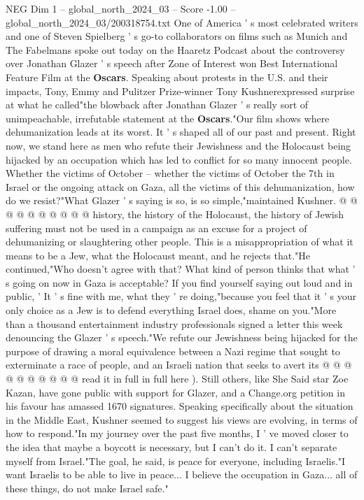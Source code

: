 \begin{textsample}{NEG Dim 1 – global\_north\_2024\_03 – Score -1.00 – global\_north\_2024\_03/200318754.txt}  \label{ex:f1_neg_069}
One of America ' s most celebrated writers and one of Steven Spielberg ' s go-to collaborators on films such as Munich and The Fabelmans spoke out today on the Haaretz Podcast about the controversy over Jonathan Glazer ' s speech after Zone of Interest won Best International Feature Film at the \textbf{Oscars}.
Speaking about protests in the U.S. and their impacts, Tony, Emmy and Pulitzer Prize-winner Tony Kushnerexpressed surprise at what he called"the blowback after Jonathan Glazer ' s really sort of unimpeachable, irrefutable statement at the \textbf{Oscars}."Our film shows where dehumanization leads at its worst.
It ' s shaped all of our past and present.
Right now, we stand here as men who refute their Jewishness and the Holocaust being hijacked by an occupation which has led to conflict for so many innocent people.
Whether the victims of October -- whether the victims of October the 7th in Israel or the ongoing attack on Gaza, all the victims of this dehumanization, how do we resist?"What Glazer ' s saying is so, is so simple,"maintained Kushner. @ @ @ @ @ @ @ @ @ @ history, the history of the Holocaust, the history of Jewish suffering must not be used in a campaign as an excuse for a project of dehumanizing or slaughtering other people.
This is a misappropriation of what it means to be a Jew, what the Holocaust meant, and he rejects that."He continued,"Who doesn't agree with that?
What kind of person thinks that what ' s going on now in Gaza is acceptable?
If you find yourself saying out loud and in public, ' It ' s fine with me, what they ' re doing,"because you feel that it ' s your only choice as a Jew is to defend everything Israel does, shame on you."More than a thousand entertainment industry professionals signed a letter this week denouncing the Glazer ' s speech."We refute our Jewishness being hijacked for the purpose of drawing a moral equivalence between a Nazi regime that sought to exterminate a race of people, and an Israeli nation that seeks to avert its @ @ @ @ @ @ @ @ @ @ read it in full in full here ).
Still others, like She Said star Zoe Kazan, have gone public with support for Glazer, and a Change.org petition in his favour has amassed 1670 signatures.
Speaking specifically about the situation in the Middle East, Kushner seemed to suggest his views are evolving, in terms of how to respond."In my journey over the past five months, I ' ve moved closer to the idea that maybe a boycott is necessary, but I can't do it.
I can't separate myself from Israel."The goal, he said, is peace for everyone, including Israelis."I want Israelis to be able to live in peace...
I believe the occupation in Gaza... all of these things, do not make Israel safe."

\end{textsample}
